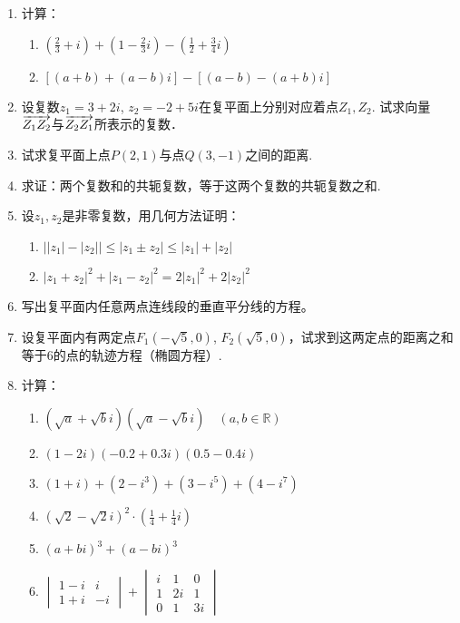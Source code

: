 \begin{enumerate}
    \item 计算：
\begin{enumerate}[(1)]
    \item $\left(\frac{2}{3}+i\right)+\left(1-\frac{2}{3}i\right)-\left(\frac{1}{2}+\frac{3}{4}i\right)$
    \item $[(a+b)+(a-b)i]-[(a-b)-(a+b)i]$
\end{enumerate}

\item 设复数$z_1=3+2i$, $z_2=-2+5i$在复平面上分别对应着点$Z_1,Z_2$. 试求向量$\overrightarrow{Z_1Z_2}$与$\overrightarrow{Z_2Z_1}$所表示的复数．
\item 试求复平面上点$P(2,1)$与点$Q(3,-1)$之间的距离.
\item 求证：两个复数和的共轭复数，等于这两个复数的共轭复数之和.
\item 设$z_1,z_2$是非零复数，用几何方法证明：
\begin{enumerate}[(1)]
    \item $\big||z_1|-|z_2|\big|\le |z_1\pm z_2|\le |z_1|+|z_2|$
    \item $|z_1+z_2|^2+|z_1-z_2|^2=2|z_1|^2+2|z_2|^2$
\end{enumerate}
\item  写出复平面内任意两点连线段的垂直平分线的方程。
\item  设复平面内有两定点$F_1(-\sqrt{5},0)$, $F_2(\sqrt{5},0)$，试求到这两定点的距离之和等于6的点的轨迹方程（椭圆方程）.
\item  计算：
\begin{enumerate}[(1)]
    \item $(\sqrt{a}+\sqrt{b}i)(\sqrt{a}-\sqrt{b}i)\quad (a,b\in\mathbb{R})$
    \item $(1-2i)(-0.2+0.3i)(0.5-0.4i)$
    \item $(1+i)+(2-i^{3})+(3-i^{5})+(4-i^{7})$
    \item $(\sqrt{2}-\sqrt{2}i)^{2}\cdot\left(\frac{1}{4}+\frac{1}{4}i\right)$
    \item $(a+bi)^{3}+(a-bi)^{3}$
    \item $\begin{vmatrix}
        1-i&i\\1+i&-i
    \end{vmatrix}+\begin{vmatrix}
        i&1&0\\1&2i&1\\0&1&3i
    \end{vmatrix}$
\end{enumerate}


\end{enumerate}

